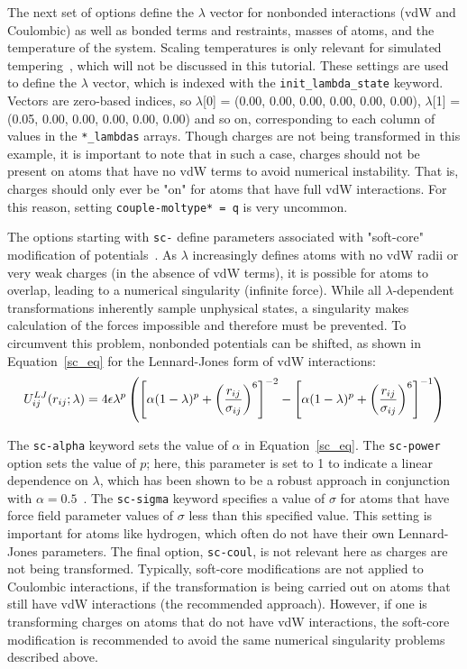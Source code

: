 \documentclass[9pt,tutorial,pubversion]{livecoms}
\begin{document}
The next set of options define the $\lambda$ vector for nonbonded interactions (vdW and Coulombic) as well as bonded terms and restraints, masses of atoms, and the temperature of the system. Scaling temperatures is only relevant for simulated tempering~\cite{Marinari1992,Geyer1995}, which will not be discussed in this tutorial. These settings are used to define the $\lambda$ vector, which is indexed with the \texttt{init\_lambda\_state} keyword. Vectors are zero-based indices, so $\lambda$[0] = (0.00, 0.00, 0.00, 0.00, 0.00, 0.00), $\lambda$[1] = (0.05, 0.00, 0.00, 0.00, 0.00, 0.00) and so on, corresponding to each column of values in the \texttt{*\_lambdas} arrays. Though charges are not being transformed in this example, it is important to note that in such a case, charges should not be present on atoms that have no vdW terms to avoid numerical instability. That is, charges should only ever be "on" for atoms that have full vdW interactions. For this reason, setting \texttt{couple-moltype* = q} is very uncommon.

The options starting with \texttt{sc-} define parameters associated with "soft-core" modification of potentials~\cite{Beutler1994}. As $\lambda$ increasingly defines atoms with no vdW radii or very weak charges (in the absence of vdW terms), it is possible for atoms to overlap, leading to a numerical singularity (infinite force). While all $\lambda$-dependent transformations inherently sample unphysical states, a singularity makes calculation of the forces impossible and therefore must be prevented. To circumvent this problem, nonbonded potentials can be shifted, as shown in Equation~\ref{sc_eq} for the Lennard-Jones form of vdW interactions: 
\begin{equation} \label{sc_eq}
\footnotesize
U_{ij}^{LJ} (r_{ij};\lambda) = 4\epsilon\lambda^p\left(\left[\alpha(1-\lambda)^p + \left(\frac{r_{ij}}{\sigma_{ij}}\right)^6\right]^{-2} - \left[\alpha(1-\lambda)^p + \left(\frac{r_{ij}}{\sigma_{ij}}\right)^6\right]^{-1}\right)
\end{equation}

The \texttt{sc-alpha} keyword sets the value of $\alpha$ in Equation~\ref{sc_eq}. The \texttt{sc-power} option sets the value of $p$; here, this parameter is set to 1 to indicate a linear dependence on $\lambda$, which has been shown to be a robust approach in conjunction with $\alpha = 0.5$~\cite{Pitera2002,Steinbrecher2007,Shirts2005}. The \texttt{sc-sigma} keyword specifies a value of $\sigma$ for atoms that have force field parameter values of $\sigma$ less than this specified value. This setting is important for atoms like hydrogen, which often do not have their own Lennard-Jones parameters. The final option, \texttt{sc-coul}, is not relevant here as charges are not being transformed. Typically, soft-core modifications are not applied to Coulombic interactions, if the transformation is being carried out on atoms that still have vdW interactions (the recommended approach). However, if one is transforming charges on atoms that do not have vdW interactions, the soft-core modification is recommended to avoid the same numerical singularity problems described above.
\end{document}
